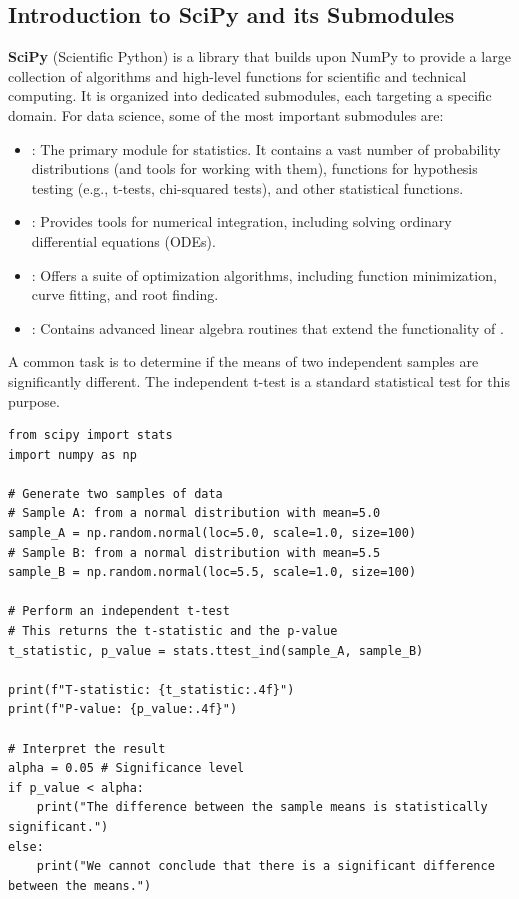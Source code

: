 \subsection{Introduction to SciPy and its Submodules}
\label{subsec:scipy_intro}
\textbf{SciPy} (Scientific Python) is a library that builds upon NumPy to provide a large collection of algorithms and high-level functions for scientific and technical computing. It is organized into dedicated submodules, each targeting a specific domain. For data science, some of the most important submodules are:
\begin{itemize}
    \item \textbf{}: The primary module for statistics. It contains a vast number of probability distributions (and tools for working with them), functions for hypothesis testing (e.g., t-tests, chi-squared tests), and other statistical functions.
    \item \textbf{}: Provides tools for numerical integration, including solving ordinary differential equations (ODEs).
    \item \textbf{}: Offers a suite of optimization algorithms, including function minimization, curve fitting, and root finding.
    \item \textbf{}: Contains advanced linear algebra routines that extend the functionality of .
\end{itemize}

\begin{example}
A common task is to determine if the means of two independent samples are significantly different. The independent t-test is a standard statistical test for this purpose.

\text{ }\begin{verbatim}
from scipy import stats
import numpy as np

# Generate two samples of data
# Sample A: from a normal distribution with mean=5.0
sample_A = np.random.normal(loc=5.0, scale=1.0, size=100)
# Sample B: from a normal distribution with mean=5.5
sample_B = np.random.normal(loc=5.5, scale=1.0, size=100)

# Perform an independent t-test
# This returns the t-statistic and the p-value
t_statistic, p_value = stats.ttest_ind(sample_A, sample_B)

print(f"T-statistic: {t_statistic:.4f}")
print(f"P-value: {p_value:.4f}")

# Interpret the result
alpha = 0.05 # Significance level
if p_value < alpha:
    print("The difference between the sample means is statistically significant.")
else:
    print("We cannot conclude that there is a significant difference between the means.")
\end{verbatim}
\end{example}

